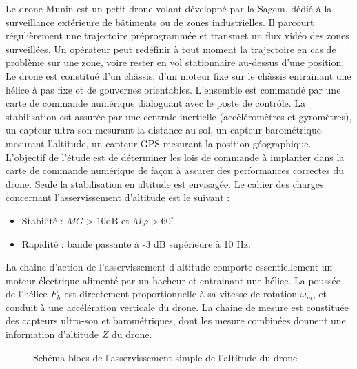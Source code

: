 \documentclass[10pt]{article}
\begin{document}
Le drone Munin est un petit drone volant développé par la Sagem, dédié à la surveillance extérieure de bâtiments ou de zones industrielles. Il parcourt régulièrement une trajectoire préprogrammée et transmet un flux vidéo des zones surveillées. Un opérateur peut redéfinir à tout moment la trajectoire en cas de problème sur une zone, voire rester en vol stationnaire au-dessus
d'une position. Le drone est constitué d'un châssis, d'un moteur fixe sur le châssis entrainant une hélice à
pas fixe et de gouvernes orientables. L'ensemble est commandé par une carte de commande
numérique dialoguant avec le poste de contrôle. La stabilisation est assurée par une centrale inertielle (accéléromètres et gyromètres), un capteur ultra-son mesurant la distance au sol, un capteur barométrique mesurant l'altitude, un capteur GPS mesurant la position géographique. L'objectif de l'étude est de déterminer les lois de commande à implanter dans la carte de commande numérique de façon à assurer des performances correctes du drone. Seule la stabilisation en altitude est envisagée. Le cahier des charges concernant l'asservissement d'altitude est le
suivant :
\begin{itemize}
	\item  Stabilité : \(M G>10 \mathrm{dB}\) et \(M \varphi>60^{\circ}\)
	\item Rapidité : bande passante à -3 dB supérieure à 10 Hz.
\end{itemize}

 La chaine d'action de l'asservissement d'altitude comporte essentiellement un moteur électrique alimenté par un hacheur et entrainant une hélice. La poussée de l'hélice \(F_{h}\) est directement proportionnelle à sa vitesse de rotation \(\omega_{m}\), et conduit à une accélération verticale du drone. La chaine de mesure est constituée des capteurs ultra-son et barométriques, dont les mesure combinées donnent une information d'altitude \(Z\) du drone.

\begin{figure}
\caption{Schéma-blocs de l'asservissement simple de l'altitude du drone}
\label{sb1}
\end{figure}
\end{document}
